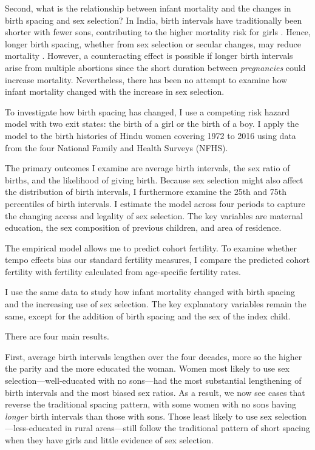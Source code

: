 \documentclass[12pt,letterpaper]{article}
\begin{document}
Second, what is the relationship between infant mortality and the changes in birth spacing 
and sex selection?
In India, birth intervals have traditionally been shorter with fewer sons, contributing 
to the higher mortality risk for girls
\citep{Whitworth2002,Bhalotra2008,Maitra2008,Jayachandran2011,Jayachandran2017a}.
Hence, longer birth spacing, whether from sex selection or secular changes, may reduce 
mortality \citep{Conde-Agudelo2012,Molitoris2019}.
However, a counteracting effect is possible if longer birth intervals arise from multiple 
abortions since the short duration between \emph{pregnancies} could increase mortality. 
Nevertheless, there has been no attempt to examine how infant mortality changed with 
the increase in sex selection.


To investigate how birth spacing has changed, I use a competing risk hazard model with 
two exit states: the birth of a girl or the birth of a boy. 
I apply the model to the birth histories of Hindu women covering 1972 to 2016 using 
data from the four National Family and Health Surveys (NFHS). 

The primary outcomes I examine are average birth intervals, the sex ratio of births, 
and the likelihood of giving birth. 
Because sex selection might also affect the distribution of birth intervals, I furthermore
examine the 25th and 75th percentiles of birth intervals. 
I estimate the model across four periods to capture the changing access and 
legality of sex selection. 
The key variables are maternal education, the sex composition of previous 
children, and area of residence.

The empirical model allows me to predict cohort fertility. 
To examine whether tempo effects bias our standard fertility measures, I compare 
the predicted cohort fertility with fertility calculated from age-specific fertility 
rates.

I use the same data to study how infant mortality changed with birth spacing and 
the increasing use of sex selection. 
The key explanatory variables remain the same, except for the addition of birth spacing 
and the sex of the index child. 

There are four main results.

First, average birth intervals lengthen over the four decades, more so the higher the 
parity and the more educated the woman.
Women most likely to use sex selection---well-educated with no sons---had the most 
substantial lengthening of birth intervals and the most biased sex ratios. 
As a result, we now see cases that reverse the traditional spacing pattern, with some 
women with no sons having \emph{longer} birth intervals than those with sons.
Those least likely to use sex selection---less-educated in rural areas---still follow 
the traditional pattern of short spacing when they have girls and little evidence of sex 
selection.
\end{document}
